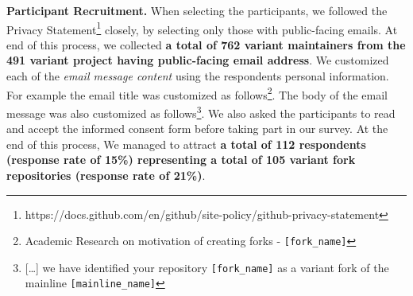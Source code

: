 \nd \textbf{Participant Recruitment.}
When selecting the participants, we followed the \gh Privacy Statement\footnote{https://docs.github.com/en/github/site-policy/github-privacy-statement} closely, by selecting only those with public-facing emails. 
At end of this process, we collected \textbf{a total of 762 variant maintainers from the 491 variant project having public-facing email address}.
We customized each of the \textit{email message content} using the respondents personal information. For example the email title was customized as follows\footnote{Academic Research on motivation of creating forks - \texttt{[fork\_name]}}. The body of the email message was also customized as follows\footnote{[\ldots] we have identified your \gh repository \texttt{[fork\_name]} as a variant fork of the mainline \texttt{[mainline\_name]}}.
We also asked the participants to read and accept the informed consent form before taking part in our survey.
At the end of this process, We managed to attract \textbf{a total of 112 respondents (response rate of 15\%) representing a total of 105 variant fork repositories (response rate of 21\%)}.

